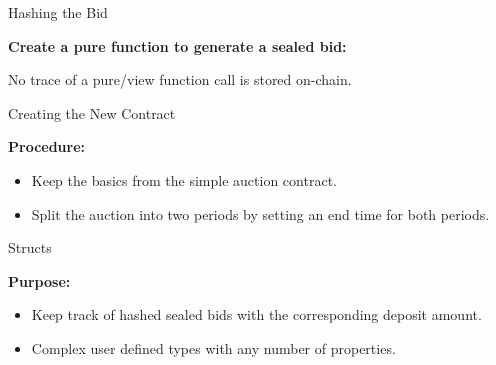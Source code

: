 \documentclass[]{beamer}
\begin{document}
\begin{frame}{Hashing the Bid}

	\textbf{Create a pure function to generate a sealed bid:}
	
	
	
	No trace of a pure/view function call is stored on-chain.\\
	
\end{frame}

\begin{frame}[allowframebreaks]{Creating the New Contract}

	\textbf{Procedure:}
	
	\begin{itemize}
		\item Keep the basics from the simple auction contract.
		\item Split the auction into two periods by setting an end time for both periods.	
	\end{itemize}
	
	

\end{frame}

\begin{frame}{Structs}

	\textbf{Purpose:}
	
	\begin{itemize}
		\item Keep track of hashed sealed bids with the corresponding deposit amount.
		\item Complex user defined types with any number of properties.
	\end{itemize}
	
	
	
	
\end{frame}
\end{document}
